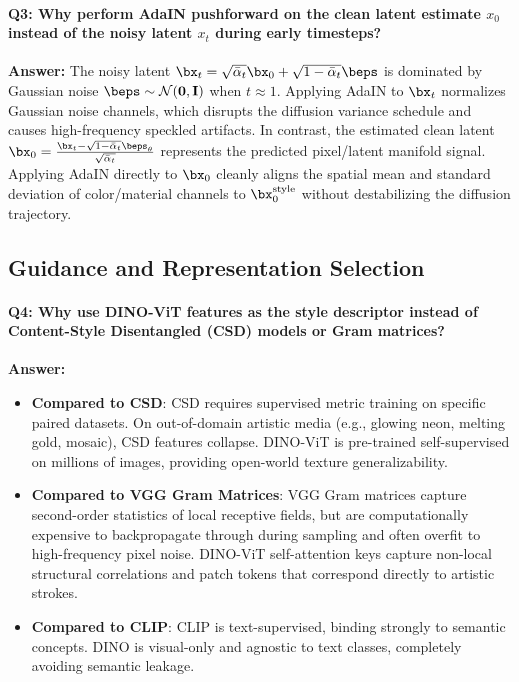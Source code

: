 \paragraph{Q3: Why perform AdaIN pushforward on the clean latent estimate $x_0$ instead of the noisy latent $x_t$ during early timesteps?}
\textbf{Answer:} The noisy latent $\bx_t = \sqrt{\bar{\alpha}_t} \bx_0 + \sqrt{1 - \bar{\alpha}_t} \beps$ is dominated by Gaussian noise $\beps \sim \mathcal{N}(\boldsymbol{0}, \mathbf{I})$ when $t \approx 1$. Applying AdaIN to $\bx_t$ normalizes Gaussian noise channels, which disrupts the diffusion variance schedule and causes high-frequency speckled artifacts. In contrast, the estimated clean latent $\bx_0 = \frac{\bx_t - \sqrt{1 - \bar{\alpha}_t} \beps_\theta}{\sqrt{\bar{\alpha}_t}}$ represents the predicted pixel/latent manifold signal. Applying AdaIN directly to $\bx_0$ cleanly aligns the spatial mean and standard deviation of color/material channels to $\bx_0^{\text{style}}$ without destabilizing the diffusion trajectory.

\subsection{Guidance and Representation Selection}

\paragraph{Q4: Why use DINO-ViT features as the style descriptor instead of Content-Style Disentangled (CSD) models or Gram matrices?}
\textbf{Answer:} 
\begin{itemize}
    \item \textbf{Compared to CSD}: CSD requires supervised metric training on specific paired datasets. On out-of-domain artistic media (e.g., glowing neon, melting gold, mosaic), CSD features collapse. DINO-ViT is pre-trained self-supervised on millions of images, providing open-world texture generalizability.
    \item \textbf{Compared to VGG Gram Matrices}: VGG Gram matrices capture second-order statistics of local receptive fields, but are computationally expensive to backpropagate through during sampling and often overfit to high-frequency pixel noise. DINO-ViT self-attention keys capture non-local structural correlations and patch tokens that correspond directly to artistic strokes.
    \item \textbf{Compared to CLIP}: CLIP is text-supervised, binding strongly to semantic concepts. DINO is visual-only and agnostic to text classes, completely avoiding semantic leakage.
\end{itemize}

